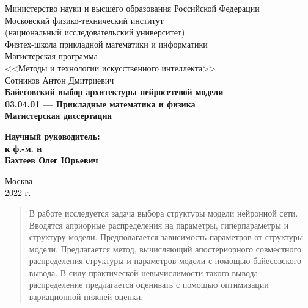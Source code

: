\documentclass[12pt]{article} %
\begin{document}
{
\renewcommand{\baselinestretch}{1}
\thispagestyle{empty}
\begin{center}
    \sc
        Министерство науки и высшего образования Российской Федерации\\
        Московский физико-технический институт\\
        {\rm(национальный исследовательский университет)}\\
        Физтех-школа прикладной математики и информатики\\
        Магистерская программа\\
        <<Методы и технологии искусственного интеллекта>>\\[35mm]
    \rm\large
        Сотников Антон Дмитриевич\\[10mm]
    \bf\Large
        Байесовский выбор архитектуры нейросетевой модели\\[10mm]
    \rm\normalsize
        03.04.01 --- Прикладные математика и физика\\[10mm]
    \sc
        Магистерская диссертация\\[30mm]
\end{center}
\hfill\parbox{80mm}{
    \begin{flushleft}
    \bf
        Научный руководитель:\\
    \rm
        к ф.-м. н\\
        Бахтеев Олег Юрьевич\\[5cm]
    \end{flushleft}
}
\begin{center}
    Москва\\
    2022 г.
\end{center}
}

\newpage
\tableofcontents

\newpage
\begin{abstract}
   В работе исследуется задача выбора структуры модели нейронной сети. Вводятся априорные распределения на параметры, гиперпараметры и структуру модели. Предполагается зависимость параметров от структуры модели.  Предлагается метод, вычисляющий апостериорного совместного распределения структуры и параметров модели с помощью байесовского вывода. В силу практической невычислимости такого вывода распределение предлагается оценивать с помощью оптимизации вариационной нижней оценки.


\end{abstract}

\newpage
\end{document}
